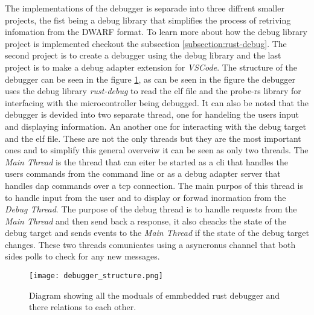  

The implementations of the debugger is separade into three diffrent smaller projects, the fist being a debug library that simplifies the process of retriving infomation from the \gls{DWARF} format.
To learn more about how the debug library project is implemented checkout the subsection \ref{subsection:rust-debug}.
The second project is to create a debugger using the debug library and the last project is to make a debug adapter extension for \emph{VSCode}.
The structure of the debugger can be seen in the figure \ref{fig:EDBStruct}, as can be seen in the figure the debugger uses the debug library \emph{rust-debug} to read the \gls{elf} file and the probe-rs library for interfacing with the microcontroller being debugged.
It can also be noted that the debugger is devided into two separate thread, one for handeling the users input and displaying information.
An another one for interacting with the debug target and the \gls{elf} file.
These are not the only threads but they are the most important ones and to simplify this general overveiw it can be seen as only two threads.
The \emph{Main Thread} is the thread that can eiter be started as a \gls{cli} that handles the users commands from the command line or as a debug adapter server that handles \acrshort{dap} commands over a \gls{tcp} connection.
The main purpos of this thread is to handle input from the user and to display or forwad inormation from the \emph{Debug Thread}.
The purpose of the debug thread is to handle requests from the \emph{Main Thread} and then send back a response, it also cheacks the state of the debug target and sends events to the \emph{Main Thread} if the state of the debug target changes.
These two threads comunicates using a asyncronus channel that both sides polls to check for any new messages.


\begin{figure}[h]
	\centering
	\texttt{[image: debugger\_structure.png]}
	\caption{Diagram showing all the moduals of emmbedded rust debugger and there relations to each other.}
	\label{fig:EDBStruct}
\end{figure}


